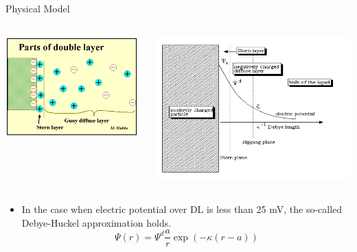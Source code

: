 \documentclass[10pt]{beamer}
\begin{document}
\begin{frame}{Physical Model}
    \begin{columns}[onlytextwidth]
        \begin{column}{0.45\textwidth}
            \includegraphics[width=\columnwidth]{7.png}
        \end{column}
        \begin{column}{0.45\textwidth}
            \includegraphics[width=\columnwidth]{8.png}
        \end{column}
    \end{columns}
    \begin{itemize}
        \item In the case when electric potential over DL is less than 25 mV, the so-called Debye-Huckel approximation holds.
              \[\Psi(r)=\Psi^d\frac{a}{r}\exp{(-\kappa(r-a))}\]
    \end{itemize}
\end{frame}
\end{document}
